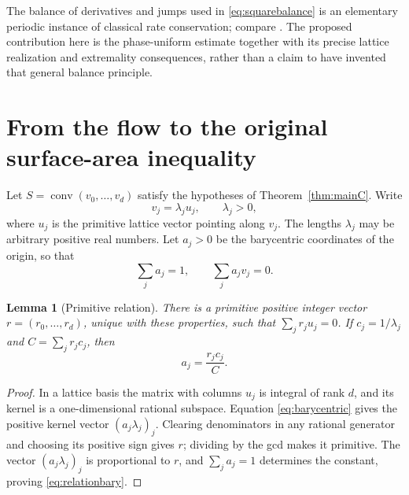 \documentclass[11pt,a4paper]{article}
\newtheorem{lemma}[theorem]{Lemma}
\theoremstyle{definition}\newtheorem{definition}[theorem]{Definition}
\theoremstyle{remark}\newtheorem{remark}[theorem]{Remark}
\DeclareMathOperator{\conv}{conv}
\begin{document}
The balance of derivatives and jumps used in
\eqref{eq:squarebalance} is an elementary periodic instance of
classical rate conservation; compare \cite[\S2, especially
equations (2.8)--(2.10)]{Miyazawa}. The proposed contribution here is
the phase-uniform estimate together with its precise lattice
realization and extremality consequences, rather than a claim to
have invented that general balance principle.

\section{From the flow to the original surface-area inequality}
\label{sec:surface}
Let $S=\conv(v_0,\ldots,v_d)$ satisfy the hypotheses of
Theorem~\ref{thm:mainC}. Write
\[
 v_j=\lambda_j u_j,\qquad \lambda_j>0,
\]
where $u_j$ is the primitive lattice vector pointing along $v_j$.
The lengths $\lambda_j$ may be arbitrary positive real numbers.
Let $a_j>0$ be the barycentric coordinates of the origin, so that
\begin{equation}\label{eq:barycentric}
 \sum_j a_j=1,\qquad \sum_j a_jv_j=0.
\end{equation}

\begin{lemma}[Primitive relation]\label{lem:relation}
There is a primitive positive integer vector
$r=(r_0,\ldots,r_d)$, unique with these properties, such that
$\sum_jr_ju_j=0$. If $c_j=1/\lambda_j$ and $C=\sum_jr_jc_j$,
then
\begin{equation}\label{eq:relationbary}
 a_j=\frac{r_jc_j}{C}.
\end{equation}
\end{lemma}
\begin{proof}
In a lattice basis the matrix with columns $u_j$ is integral of
rank $d$, and its kernel is a one-dimensional rational subspace.
Equation \eqref{eq:barycentric} gives the positive kernel vector
$(a_j\lambda_j)_j$. Clearing denominators in any rational generator
and choosing its positive sign gives $r$; dividing by the gcd makes
it primitive. The vector $(a_j\lambda_j)_j$ is proportional to $r$,
and $\sum_ja_j=1$ determines the constant, proving
\eqref{eq:relationbary}.
\end{proof}
\end{document}
